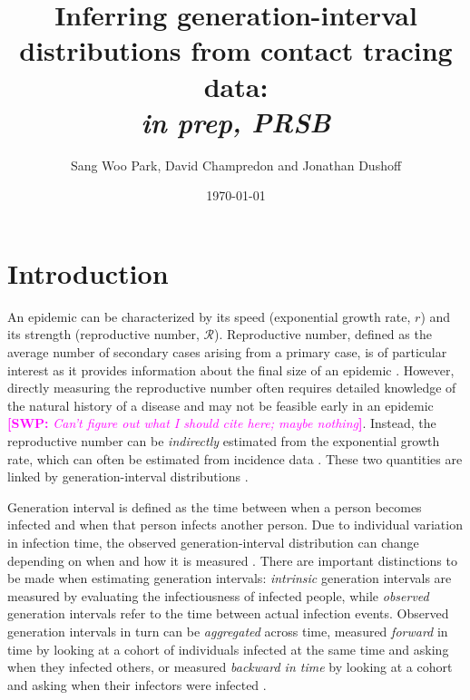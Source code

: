 \documentclass[12pt]{article}
\title{Inferring generation-interval distributions from contact tracing data: \\ \emph{in prep, PRSB}}
\author{Sang Woo Park, David Champredon and Jonathan Dushoff}
\date{\today}
\newcommand{\RR}{\ensuremath{{\mathcal R}}}
\newcommand{\comment}[3]{\textcolor{#1}{\textbf{[#2: }\textsl{#3}\textbf{]}}}
\newcommand{\swp}[1]{\comment{magenta}{SWP}{#1}}
\begin{document}
\maketitle

\section{Introduction}


An epidemic can be characterized by its speed (exponential growth rate, $r$) and its strength (reproductive number, \RR).
Reproductive number, defined as the average number of secondary cases arising from a primary case, is of particular interest as it provides information about the final size of an epidemic \citep{anderson1991infectious, diekmann1990definition}.
However, directly measuring the reproductive number often requires detailed knowledge of the natural history of a disease and may not be feasible early in an epidemic \swp{Can't figure out what I should cite here; maybe nothing}.
Instead, the reproductive number can be \emph{indirectly} estimated from the exponential growth rate, which can often be estimated from incidence data \citep{mills2004transmissibility, nishiura2009transmission, ma2014estimating}.
These two quantities are linked by generation-interval distributions \citep{wallinga2007generation, park2019practical}.

Generation interval is defined as the time between when a person becomes infected and when that person infects another person.
Due to individual variation in infection time, the observed generation-interval distribution can change depending on when and how it is measured \citep{svensson2007note, kenah2008generation, nishiura2010time, champredon2015intrinsic}.
There are important distinctions to be made when estimating generation intervals: \emph{intrinsic} generation intervals are measured by evaluating the infectiousness of infected people,
while \emph{observed} generation intervals refer to the time between actual infection events.
Observed generation intervals in turn can be \emph{aggregated} across time, measured \emph{forward} in time by looking at a cohort of individuals infected at the same time and asking when they infected others, or measured \emph{backward in time} by looking at a cohort and asking when their infectors were infected \citep{champredon2015intrinsic}.
\end{document}
